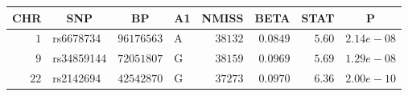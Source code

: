 \begin{center}
\begin{tabular}{rlrlrrrr}
\hline\hline
\multicolumn{1}{c}{CHR}&\multicolumn{1}{c}{SNP}&\multicolumn{1}{c}{BP}&\multicolumn{1}{c}{A1}&\multicolumn{1}{c}{NMISS}&\multicolumn{1}{c}{BETA}&\multicolumn{1}{c}{STAT}&\multicolumn{1}{c}{P}\tabularnewline
\hline
$ 1$&rs6678734&$96176563$&A&$38132$&$0.0849$&$5.60$&$2.14e-08$\tabularnewline
$ 9$&rs34859144&$72051807$&G&$38159$&$0.0969$&$5.69$&$1.29e-08$\tabularnewline
$22$&rs2142694&$42542870$&G&$37273$&$0.0970$&$6.36$&$2.00e-10$\tabularnewline
\hline
\end{tabular}\end{center}
